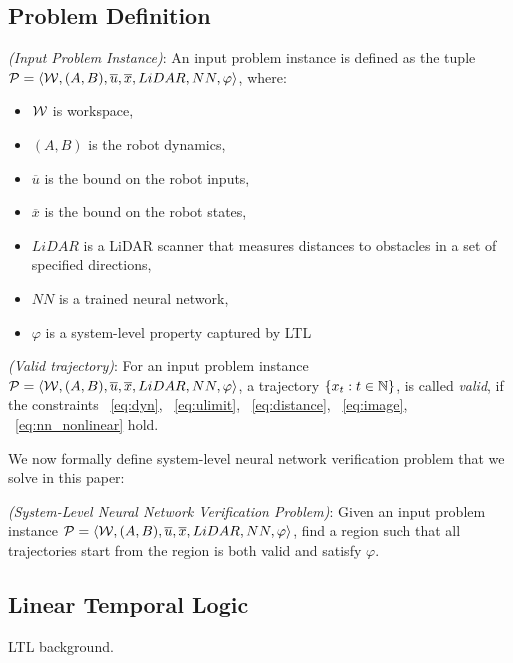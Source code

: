 \subsection{Problem Definition}

\begin{definition}
    \textit{(Input Problem Instance)}: An input problem instance is defined as the tuple 
    $\mathcal{P} = \langle {\mathcal{W}}, (A, B), \overline{u}, \overline{x}, LiDAR, NN, \varphi \rangle$, where:
    \begin{itemize}
        \item ${\mathcal{W}}$ is workspace,
        \item $(A, B)$ is the robot dynamics,
        \item $\overline{u}$ is the bound on the robot inputs,
        \item $\overline{x}$ is the bound on the robot states,
        \item $LiDAR$ is a LiDAR scanner that measures distances to obstacles in a set of specified directions,
        \item $NN$ is a trained neural network, 
        \item $\varphi$ is a system-level property captured by LTL
    \end{itemize}
\end{definition}    


\begin{definition}
    \textit{(Valid trajectory)}: For an input problem instance 
    $\mathcal{P} = \langle {\mathcal{W}}, (A, B), \overline{u}, \overline{x}, LiDAR, NN, \varphi \rangle$,
    a trajectory $\{x_t: t \in {\mathbb{N}}\}$, is called \textit{valid}, 
    if the constraints ~\eqref{eq:dyn}, ~\eqref{eq:ulimit}, ~\eqref{eq:distance}, ~\eqref{eq:image}, ~\eqref{eq:nn_nonlinear} hold.
\end{definition}

We now formally define system-level neural network verification problem that we solve in this paper:
\begin{definition}
    \textit{(System-Level Neural Network Verification Problem)}: Given an input problem instance 
    $\mathcal{P} = \langle {\mathcal{W}}, (A, B), \overline{u}, \overline{x}, LiDAR, NN, \varphi \rangle$,
    find a region such that all trajectories start from the region is both valid and satisfy $\varphi$.
\end{definition}    



\subsection{Linear Temporal Logic}

{\color{blue} LTL background.}



